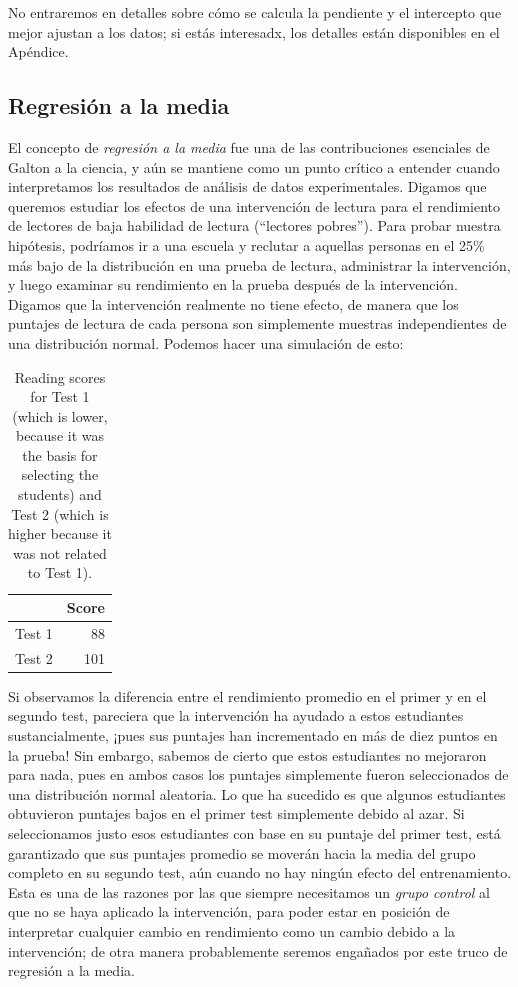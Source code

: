 \documentclass[
  12pt,
]{book}
\begin{document}
No entraremos en detalles sobre cómo se calcula la pendiente y el intercepto que mejor ajustan a los datos; si estás interesadx, los detalles están disponibles en el Apéndice.

\hypertarget{regression-to-the-mean}{%
\subsection{Regresión a la media}\label{regression-to-the-mean}}

El concepto de \emph{regresión a la media} fue una de las contribuciones esenciales de Galton a la ciencia, y aún se mantiene como un punto crítico a entender cuando interpretamos los resultados de análisis de datos experimentales. Digamos que queremos estudiar los efectos de una intervención de lectura para el rendimiento de lectores de baja habilidad de lectura (``lectores pobres''). Para probar nuestra hipótesis, podríamos ir a una escuela y reclutar a aquellas personas en el 25\% más bajo de la distribución en una prueba de lectura, administrar la intervención, y luego examinar su rendimiento en la prueba después de la intervención. Digamos que la intervención realmente no tiene efecto, de manera que los puntajes de lectura de cada persona son simplemente muestras independientes de una distribución normal. Podemos hacer una simulación de esto:

\begin{table}

\caption{\label{tab:unnamed-chunk-95}Reading scores for Test 1 (which is lower, because it was the basis for selecting the students) and Test 2 (which is higher because it was not related to Test 1).}
\centering
\begin{tabular}[t]{l|r}
\hline
  & Score\\
\hline
Test 1 & 88\\
\hline
Test 2 & 101\\
\hline
\end{tabular}
\end{table}

Si observamos la diferencia entre el rendimiento promedio en el primer y en el segundo test, pareciera que la intervención ha ayudado a estos estudiantes sustancialmente, ¡pues sus puntajes han incrementado en más de diez puntos en la prueba! Sin embargo, sabemos de cierto que estos estudiantes no mejoraron para nada, pues en ambos casos los puntajes simplemente fueron seleccionados de una distribución normal aleatoria. Lo que ha sucedido es que algunos estudiantes obtuvieron puntajes bajos en el primer test simplemente debido al azar. Si seleccionamos justo esos estudiantes con base en su puntaje del primer test, está garantizado que sus puntajes promedio se moverán hacia la media del grupo completo en su segundo test, aún cuando no hay ningún efecto del entrenamiento. Esta es una de las razones por las que siempre necesitamos un \emph{grupo control} al que no se haya aplicado la intervención, para poder estar en posición de interpretar cualquier cambio en rendimiento como un cambio debido a la intervención; de otra manera probablemente seremos engañados por este truco de regresión a la media.
\end{document}
